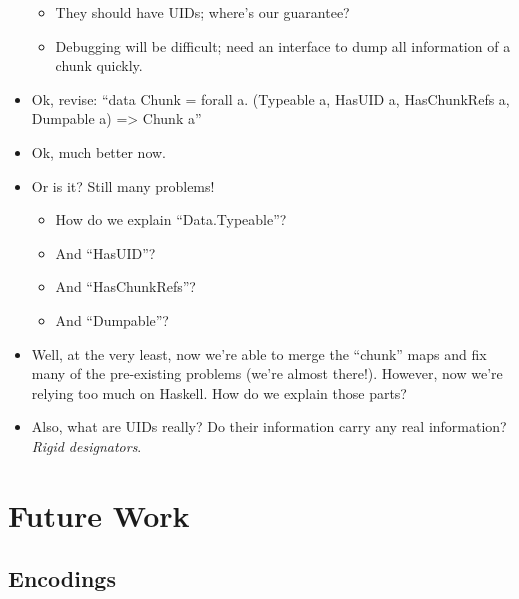 \begin{itemize}
\begin{itemize}
                  \item They should have UIDs; where's our guarantee?

                  \item Debugging will be difficult; need an interface to dump
                        all information of a chunk quickly.

            \end{itemize}

      \item Ok, revise: ``data Chunk = forall a. (Typeable a, HasUID a,
            HasChunkRefs a, Dumpable a) => Chunk a''

      \item Ok, much better now.

      \item Or is it? Still many problems!
            \begin{itemize}

                  \item How do we explain ``Data.Typeable''?

                  \item And ``HasUID''?

                  \item And ``HasChunkRefs''?

                  \item And ``Dumpable''?

            \end{itemize}

      \item Well, at the very least, now we're able to merge the ``chunk'' maps
            and fix many of the pre-existing problems (we're almost there!).
            However, now we're relying too much on Haskell. How do we explain
            those parts?

      \item Also, what are UIDs really? Do their information carry any real
            information? \textit{Rigid designators}.

\end{itemize}

\section{Future Work}

\subsection{Encodings}

